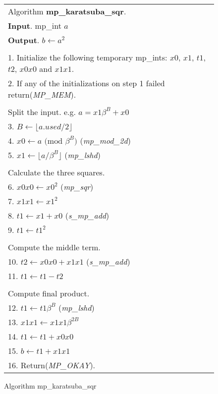 \documentclass[b5paper]{book}
\begin{document}
\newpage\begin{figure}[!here]
\begin{small}
\begin{center}
\begin{tabular}{l}
\hline Algorithm \textbf{mp\_karatsuba\_sqr}. \\
\textbf{Input}.   mp\_int $a$ \\
\textbf{Output}.  $b \leftarrow a^2$ \\
\hline \\
1.  Initialize the following temporary mp\_ints:  $x0$, $x1$, $t1$, $t2$, $x0x0$ and $x1x1$. \\
2.  If any of the initializations on step 1 failed return(\textit{MP\_MEM}). \\
\\
Split the input.  e.g. $a = x1\beta^B + x0$ \\
3.  $B \leftarrow \lfloor a.used / 2 \rfloor$ \\
4.  $x0 \leftarrow a \mbox{ (mod }\beta^B\mbox{)}$ (\textit{mp\_mod\_2d}) \\
5.  $x1 \leftarrow \lfloor a / \beta^B \rfloor$ (\textit{mp\_lshd}) \\
\\
Calculate the three squares. \\
6.  $x0x0 \leftarrow x0^2$ (\textit{mp\_sqr}) \\
7.  $x1x1 \leftarrow x1^2$ \\
8.  $t1 \leftarrow x1 + x0$ (\textit{s\_mp\_add}) \\
9.  $t1 \leftarrow t1^2$ \\
\\
Compute the middle term. \\
10.  $t2 \leftarrow x0x0 + x1x1$ (\textit{s\_mp\_add}) \\
11.  $t1 \leftarrow t1 - t2$ \\
\\
Compute final product. \\
12.  $t1 \leftarrow t1\beta^B$ (\textit{mp\_lshd}) \\
13.  $x1x1 \leftarrow x1x1\beta^{2B}$ \\
14.  $t1 \leftarrow t1 + x0x0$ \\
15.  $b \leftarrow t1 + x1x1$ \\
16.  Return(\textit{MP\_OKAY}). \\
\hline
\end{tabular}
\end{center}
\end{small}
\caption{Algorithm mp\_karatsuba\_sqr}
\end{figure}
\end{document}
